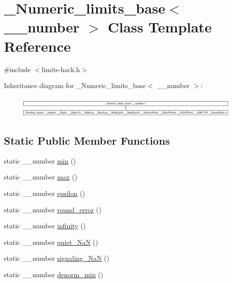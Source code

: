 \hypertarget{class__Numeric__limits__base}{}\section{\+\_\+\+Numeric\+\_\+limits\+\_\+base$<$ \+\_\+\+\_\+number $>$ Class Template Reference}
\label{class__Numeric__limits__base}


{\ttfamily \#include $<$limits-\/hack.\+h$>$}

Inheritance diagram for \+\_\+\+Numeric\+\_\+limits\+\_\+base$<$ \+\_\+\+\_\+number $>$\+:\begin{figure}[H]
\begin{center}
\leavevmode
\includegraphics[height=1.091618cm]{class__Numeric__limits__base}
\end{center}
\end{figure}
\subsection*{Static Public Member Functions}
\begin{DoxyCompactItemize}
\item 
static \+\_\+\+\_\+number \hyperlink{class__Numeric__limits__base_aa30696aea84bb9b14a184a0897263244}{min} ()
\item 
static \+\_\+\+\_\+number \hyperlink{class__Numeric__limits__base_aaa88f428bef4fefbc113909a00471537}{max} ()
\item 
static \+\_\+\+\_\+number \hyperlink{class__Numeric__limits__base_a91bd7f890f24aa5a9cb3d5a4e2e7689c}{epsilon} ()
\item 
static \+\_\+\+\_\+number \hyperlink{class__Numeric__limits__base_a18c6875c99789d503cc035da80ec73c0}{round\+\_\+error} ()
\item 
static \+\_\+\+\_\+number \hyperlink{class__Numeric__limits__base_a8e3069adefb7a3c4ace1ec3928835d81}{infinity} ()
\item 
static \+\_\+\+\_\+number \hyperlink{class__Numeric__limits__base_a24572931df696e37257a8f48cef35d16}{quiet\+\_\+\+Na\+N} ()
\item 
static \+\_\+\+\_\+number \hyperlink{class__Numeric__limits__base_af2af4cddcdf60e5da9e65abbfbb7d15b}{signaling\+\_\+\+Na\+N} ()
\item 
static \+\_\+\+\_\+number \hyperlink{class__Numeric__limits__base_a402274c2f02952c35519b7d3581db32c}{denorm\+\_\+min} ()
\end{DoxyCompactItemize}
